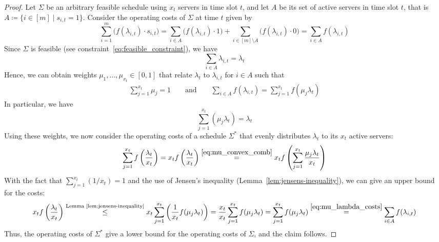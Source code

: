 \begin{proof}
Let $\Sigma$ be an arbitrary feasible schedule using $x_t$ servers in time slot $t$, and let $A$ be its set of active servers in time slot $t$, that is $A\coloneqq\{i\in[m]\mid s_{i,t}=1\}$.
Consider the operating costs of $\Sigma$ at time $t$ given by
\begin{equation*}
	\sum\limits_{i=1}^{m}\bigl(f(\lambda_{i,t})\cdot s_{i,t}\bigr)=\sum\limits_{i\in A}\bigl(f(\lambda_{i,t})\cdot1\bigr)+\sum\limits_{i\in [m]\setminus A}\bigl(f(\lambda_{i,t})\cdot0\bigr)=\sum\limits_{i\in A}f(\lambda_{i,t})
\end{equation*}
Since $\Sigma$ is feasible (see constraint~\eqref{eq:feasible_constraint}), we have 
\begin{equation*}
	\sum\limits_{i\in A}\lambda_{i,t}=\lambda_t
\end{equation*}
Hence, we can obtain weights $\mu_1,\dotsc,\mu_{x_t}\in[0,1]$ that relate $\lambda_t$ to $\lambda_{i,t}$ for $i\in A$ such that
\begin{align}
	\sum\limits_{j=1}^{x_t}\mu_j=1\qquad\text{and}\qquad \sum\limits_{i\in A}f(\lambda_{i,t})=\sum\limits_{j=1}^{x_t}f(\mu_j\lambda_t)\label{eq:mu_lambda_costs}
\end{align}
In particular, we have 
\begin{equation}
	\sum_{j=1}^{x_t}(\mu_j\lambda_t)=\lambda_t\label{eq:mu_convex_comb}
\end{equation}
Using these weights, we now consider the operating costs of a schedule $\Sigma^*$ that evenly distributes $\lambda_t$ to its $x_t$ active servers:
\begin{align*}
	\sum\limits_{j=1}^{x_t}f\left(\frac{\lambda_t}{x_t}\right)=x_tf\left(\frac{\lambda_t}{x_t}\right)\stackrel{\eqref{eq:mu_convex_comb}}{=}x_tf\left(\sum\limits_{j=1}^{x_t}{\frac{\mu_j\lambda_t}{x_t}}\right)
\end{align*}
With the fact that $\sum_{j=1}^{x_t}(1/x_t)=1$ and the use of Jensen's inequality (Lemma~\ref{lem:jensens-inequality}), we can give an upper bound for the costs:
\begin{align*}
	x_tf\left(\frac{\lambda_t}{x_t}\right)\stackrel{\text{Lemma~\ref{lem:jensens-inequality}}}{\le}x_t\sum\limits_{j=1}^{x_t}\left(\frac{1}{x_t}f(\mu_j\lambda_t)\right)=\frac{x_t}{x_t}\sum\limits_{j=1}^{x_t}f(\mu_j\lambda_t)=\sum\limits_{j=1}^{x_t}f(\mu_j\lambda_t)\stackrel{\eqref{eq:mu_lambda_costs}}{=}\sum\limits_{i\in A}f(\lambda_{i,t})
\end{align*}
Thus, the operating costs of $\Sigma^*$ give a lower bound for the operating costs of $\Sigma$, and the claim follows.
\end{proof}
